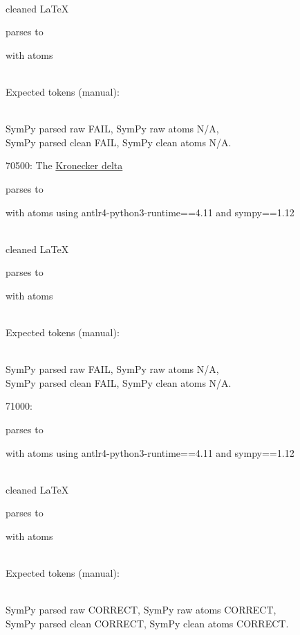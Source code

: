 \documentclass{article}
\begin{document}
\ \\
cleaned \LaTeX

parses to

with atoms


\ \\
Expected tokens (manual):


\ \\
SymPy parsed raw FAIL, 
SymPy raw atoms N/A, \\
SymPy parsed clean FAIL, 
SymPy clean atoms N/A.

\hrulefill

70500:
The \href{https://en.wikipedia.org/wiki/Kronecker_delta}{Kronecker delta}

parses to

with atoms
using antlr4-python3-runtime==4.11 and sympy==1.12

\ \\
cleaned \LaTeX

parses to

with atoms


\ \\
Expected tokens (manual):


\ \\
SymPy parsed raw FAIL, 
SymPy raw atoms N/A, \\
SymPy parsed clean FAIL, 
SymPy clean atoms N/A.

\hrulefill


71000:

parses to

with atoms
using antlr4-python3-runtime==4.11 and sympy==1.12

\ \\
cleaned \LaTeX

parses to

with atoms


\ \\
Expected tokens (manual):




\ \\
SymPy parsed raw CORRECT, 
SymPy raw atoms CORRECT, \\
SymPy parsed clean CORRECT, 
SymPy clean atoms CORRECT.

\hrulefill
\end{document}
